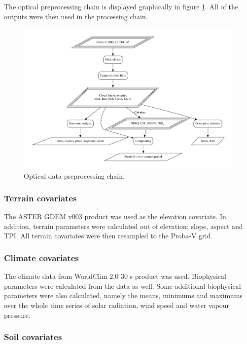 \documentclass[a4paper,10pt]{article}
\begin{document}
The optical preprocessing chain is displayed graphically in figure \ref{fig-preprocessing-optical}.
All of the outputs were then used in the processing chain.

\begin{figure}
 \includegraphics[width=\textwidth]{article-figures/flowcharts/preprocessing-optical}
 \caption{Optical data preprocessing chain.}
 \label{fig-preprocessing-optical}
\end{figure}

\subsubsection{Terrain covariates}

The ASTER GDEM v003 \citep{ASTGTM003} product was used as the elevation covariate.
In addition, terrain parameters were calculated out of elevation: slope, aspect and \ac{TPI}.
All terrain covariates were then resampled to the Proba-V grid.

\subsubsection{Climate covariates}

The climate data from WorldClim 2.0 30 s product \citep{worldclim2} was used.
Biophysical parameters were calculated from the data as well.
Some additional biophysical parameters were also calculated, namely the means, minimums and maximums over the whole time series of solar radiation, wind speed and water vapour pressure.

\subsubsection{Soil covariates}
\end{document}
